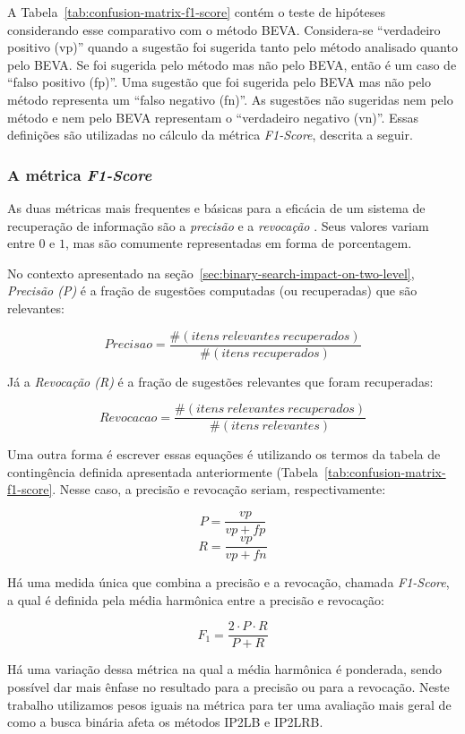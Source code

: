 A Tabela~\ref{tab:confusion-matrix-f1-score} contém o teste de hipóteses considerando esse comparativo com o método BEVA. Considera-se ``verdadeiro positivo (vp)'' quando a sugestão foi sugerida tanto pelo método analisado quanto pelo BEVA. Se foi sugerida pelo método mas não pelo BEVA, então é um caso de ``falso positivo (fp)''. Uma sugestão que foi sugerida pelo BEVA mas não pelo método representa um ``falso negativo (fn)''. As sugestões não sugeridas nem pelo método e nem pelo BEVA representam o ``verdadeiro negativo (vn)''. Essas definições são utilizadas no cálculo da métrica \textit{F1-Score}, descrita a seguir.


\subsubsection{A métrica \textit{F1-Score}}

As duas métricas mais frequentes e básicas para a eficácia de um sistema de recuperação de informação são a \textit{precisão} e a \textit{revocação}  \citep{irbookchristopher}. Seus valores variam entre $0$ e $1$, mas são comumente representadas em forma de porcentagem.

No contexto apresentado na seção~\ref{sec:binary-search-impact-on-two-level}, \textit{Precisão (P)} é a fração de sugestões computadas (ou recuperadas) que são relevantes:

$$ Precisao = \frac{\#(itens\ relevantes\ recuperados)}{\#(itens\ recuperados)}$$

Já a \textit{Revocação (R)} é a fração de sugestões relevantes que foram recuperadas:

$$ Revocacao = \frac{\#(itens\ relevantes\ recuperados)}{\#(itens\ relevantes)}$$

Uma outra forma é escrever essas equações é utilizando os termos da tabela de contingência definida apresentada anteriormente (Tabela~\ref{tab:confusion-matrix-f1-score}. Nesse caso, a precisão e revocação seriam, respectivamente:

$$P = \frac{vp}{vp + fp}$$
$$R = \frac{vp}{vp + fn}$$

Há uma medida única que combina a precisão e a revocação, chamada \textit{F1-Score}, a qual é definida pela média harmônica entre a precisão e revocação:

$$F_{1} = \frac{2 \cdot P \cdot R}{P + R}$$

Há uma variação dessa métrica na qual a média harmônica é ponderada, sendo possível dar mais ênfase no resultado para a precisão ou para a revocação. Neste trabalho utilizamos pesos iguais na métrica para ter uma avaliação mais geral de como a busca binária afeta os métodos IP2LB e IP2LRB.

